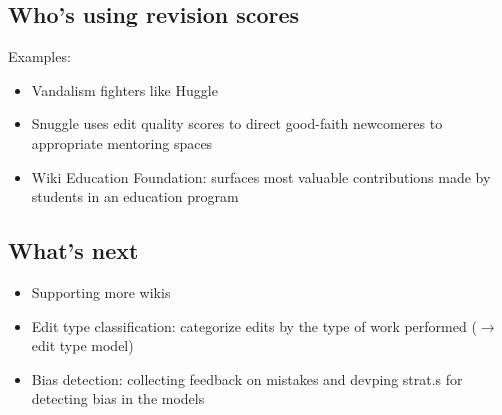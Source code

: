 \documentclass[12pt,a4paper]{article}
\begin{document}
\subsection{Who's using revision scores}
Examples:
\begin{itemize}
\item Vandalism fighters like Huggle
\item Snuggle uses edit quality scores to direct good-faith newcomeres to appropriate mentoring spaces
\item Wiki Education Foundation: surfaces most valuable contributions made by students in an education program
\end{itemize}
\subsection{What's next}
\begin{itemize}
\item Supporting more wikis
\item Edit type classification: categorize edits by the type of work performed (\(\rightarrow\) edit type model)
\item Bias detection: collecting feedback on mistakes and devping strat.s for detecting bias in the models
\end{itemize}
\end{document}
